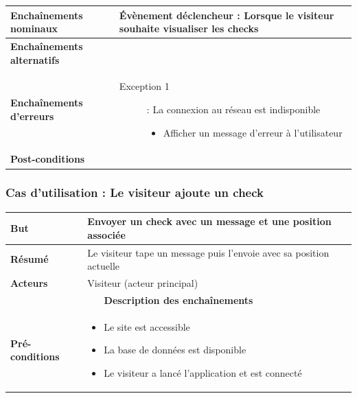 \documentclass[a4paper,12pt]{report}
\begin{document}
\begin{onehalfspace}
\begin{tabular}{|p{3cm}|p{}|}
\textbf{Enchaînements nominaux} &
Évènement déclencheur : Lorsque le visiteur souhaite visualiser les checks
\\ \hline %

\textbf{Enchaînements alternatifs} &
\\ \hline %

\textbf{Enchaînements d'erreurs} &
  \begin{description}
    \item[Exception 1]: La connexion au réseau est indisponible
    \begin{itemize}
      \item Afficher un message d’erreur à l'utilisateur
    \end{itemize}
  \end{description}
\\ \hline %

\textbf{Post-conditions} &
\\ \hline %

\end{tabular}

\subsubsection{Cas d'utilisation : Le visiteur ajoute un check}
\begin{tabular}{|p{3cm}|p{}|}
\hline %

\textbf{But} &
Envoyer un check avec un message et une position associée
\\ \hline %

\textbf{Résumé} &
Le visiteur tape un message puis l'envoie avec sa position actuelle
\\ \hline %

\textbf{Acteurs} &
Visiteur (acteur principal)
\\ \hline %

\multicolumn{2}{|c|}{\textbf{Description des enchaînements}}
\\ \hline %

\textbf{Pré-conditions} &
    \begin{itemize}
      \item Le site est accessible
      \item La base de données est disponible
      \item Le visiteur a lancé l'application et est connecté
    \end{itemize}
\\ \hline %


\end{tabular}
\end{onehalfspace}
\end{document}
